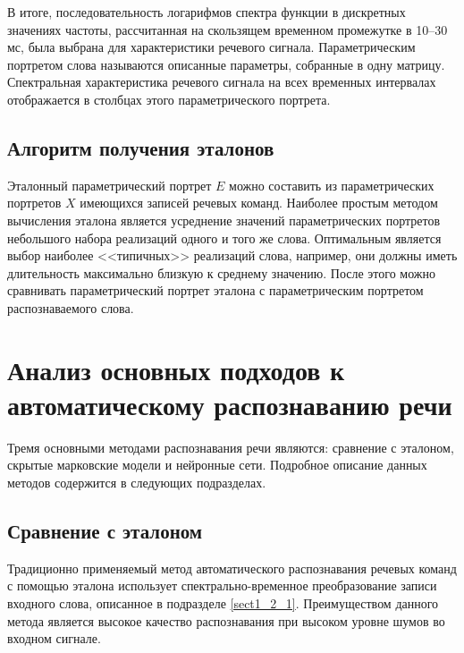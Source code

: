 В итоге, последовательность логарифмов спектра функции в дискретных значениях частоты, рассчитанная на скользящем временном промежутке в 10--30 мс, была выбрана для характеристики речевого сигнала.
Параметрическим портретом слова называются описанные параметры, собранные в одну матрицу.
Спектральная характеристика речевого сигнала на всех временных интервалах отображается в столбцах этого параметрического портрета.


\subsection{Алгоритм получения эталонов} \label{sect1_2_2}

Эталонный параметрический портрет $E$ можно составить из параметрических портретов $X$ имеющихся записей речевых команд.
Наиболее простым методом вычисления эталона является усреднение значений параметрических портретов небольшого набора реализаций одного и того же слова.
Оптимальным является выбор наиболее <<типичных>> реализаций слова, например, они должны иметь длительность максимально близкую к среднему значению.
После этого можно сравнивать параметрический портрет эталона с параметрическим портретом распознаваемого слова.


\section{Анализ основных подходов к автоматическому распознаванию речи} \label{sect1_3}

Тремя основными методами распознавания речи являются: сравнение с эталоном, скрытые марковские модели и нейронные сети.
Подробное описание данных методов содержится в следующих подразделах.


\subsection{Сравнение с эталоном} \label{sect1_3_1}

Традиционно применяемый метод автоматического распознавания речевых команд с помощью эталона использует спектрально-временное преобразование записи входного слова, описанное в подразделе \ref{sect1_2_1}.
Преимуществом данного метода является высокое качество распознавания при высоком уровне шумов во входном сигнале.

